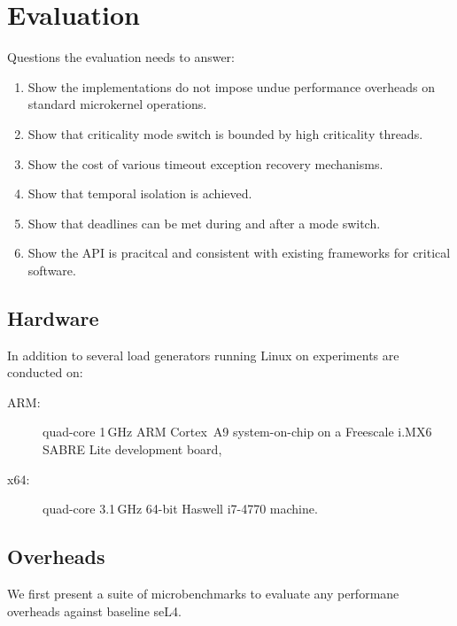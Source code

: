 \chapter{Evaluation}
\label{chap:evaluation}

Questions the evaluation needs to answer:

\begin{enumerate}
\item Show the implementations do not impose undue performance overheads on standard microkernel
operations.
\item Show that criticality mode switch is bounded by high criticality threads.
\item Show the cost of various timeout exception recovery mechanisms.
\item Show that temporal isolation is achieved.
\item Show that deadlines can be met during and after a mode switch.
\item Show the API is pracitcal and consistent with existing frameworks for critical software.
\end{enumerate}

\section{Hardware}

In addition to several load generators running Linux on experiments are conducted on:

\begin{description}
    \item[ARM:] quad-core 1\,GHz ARM Cortex~A9 system-on-chip on a Freescale i.MX6 SABRE Lite development board,
    \item[x64:] quad-core 3.1\,GHz 64-bit Haswell i7-4770 machine.
\end{description}



\section{Overheads}

We first present a suite of microbenchmarks to evaluate any performane overheads against baseline seL4.


